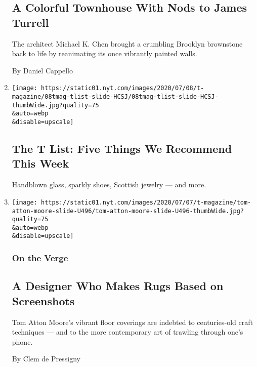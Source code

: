 \begin{enumerate}
  \hypertarget{a-colorful-townhouse-with-nods-to-james-turrell}{%
  \subsection{A Colorful Townhouse With Nods to James
  Turrell}\label{a-colorful-townhouse-with-nods-to-james-turrell}}

  The architect Michael K. Chen brought a crumbling Brooklyn brownstone
  back to life by reanimating its once vibrantly painted walls.

  By Daniel Cappello
\item
  \href{/2020/07/09/t-magazine/robert-longo-quarantine-films.html}{}

  \texttt{[image: https://static01.nyt.com/images/2020/07/08/t-magazine/08tmag-tlist-slide-HCSJ/08tmag-tlist-slide-HCSJ-thumbWide.jpg?quality=75\\\&auto=webp\\\&disable=upscale]}

  \hypertarget{the-t-list-five-things-we-recommend-this-week-2}{%
  \subsection{The T List: Five Things We Recommend This
  Week}\label{the-t-list-five-things-we-recommend-this-week-2}}

  Handblown glass, sparkly shoes, Scottish jewelry --- and more.
\item
  \href{/2020/07/07/t-magazine/tom-atton-moore.html}{}

  \texttt{[image: https://static01.nyt.com/images/2020/07/07/t-magazine/tom-atton-moore-slide-U496/tom-atton-moore-slide-U496-thumbWide.jpg?quality=75\\\&auto=webp\\\&disable=upscale]}

  \hypertarget{on-the-verge}{%
  \subsubsection{On the Verge}\label{on-the-verge}}

  \hypertarget{a-designer-who-makes-rugs-based-on-screenshots}{%
  \subsection{A Designer Who Makes Rugs Based on
  Screenshots}\label{a-designer-who-makes-rugs-based-on-screenshots}}

  Tom Atton Moore's vibrant floor coverings are indebted to
  centuries-old craft techniques --- and to the more contemporary art of
  trawling through one's phone.

  By Clem de Pressigny
\end{enumerate}

